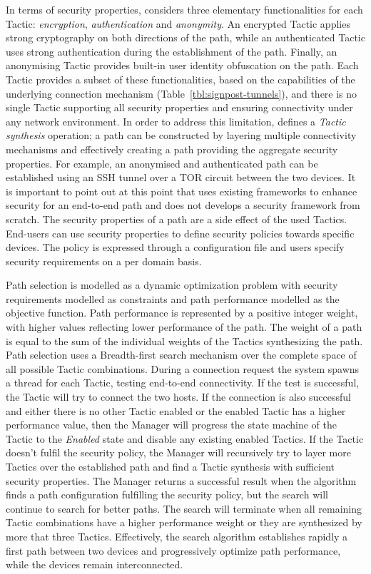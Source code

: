 In terms of security properties, \signpost considers three elementary
functionalities for each Tactic: \textit{encryption}, \textit{authentication}
and \textit{anonymity}.  An encrypted Tactic applies strong cryptography on both
directions of the path, while an authenticated Tactic uses strong authentication
during the establishment of the path.  Finally, an anonymising Tactic provides
built-in user identity obfuscation on the path.  Each Tactic provides a subset
of these functionalities, based on the capabilities of the underlying connection
mechanism (Table~\ref{tbl:signpost-tunnels}), and there is no single Tactic
supporting all security properties and ensuring connectivity under any network
environment. In order to address this limitation, \signpost defines a
\textit{Tactic synthesis} operation; a path can be constructed by layering
multiple connectivity mechanisms and effectively creating a path providing the
aggregate security properties. For example, an anonymised and authenticated path can
be established using an SSH tunnel over a TOR circuit between the two devices.
It is important to point out at this point that \signpost uses existing
frameworks to enhance security for an end-to-end path and does not develops a
security framework from scratch. The security properties of a path are a side
effect of the used Tactics.  End-users can use security properties to define
security policies towards specific devices. The policy is expressed through a
configuration file and users specify security requirements on a per domain
basis. 

Path selection is modelled as a dynamic optimization problem with security
requirements modelled as constraints and path performance modelled as the
objective function.  Path performance is represented by a positive integer
weight, with higher values reflecting lower performance of the path. The weight
of a path is equal to the sum of the individual weights of the Tactics
synthesizing the path.  Path selection uses a Breadth-first search mechanism
over the complete space of all possible Tactic combinations.  During a
connection request the system spawns a thread for each Tactic, testing
end-to-end connectivity.  If the test is successful, the Tactic will try to
connect the two hosts. If the connection is also successful and either there is
no other Tactic enabled or the enabled Tactic has a higher performance value,
then the Manager will progress the state machine of the Tactic to the
\emph{Enabled} state and disable any existing enabled Tactics. If the Tactic
doesn't fulfil the security policy, the Manager will recursively try to layer
more Tactics over the established path and find a Tactic synthesis with
sufficient security properties. The Manager returns a successful result when the
algorithm finds a path configuration fulfilling the security policy, but the
search will continue to search for better paths.  The search will terminate when
all remaining Tactic combinations have a higher performance weight or they are
synthesized by more that three Tactics.  Effectively, the search algorithm
establishes rapidly a first path between two devices and progressively optimize
path performance, while the devices remain interconnected. 

